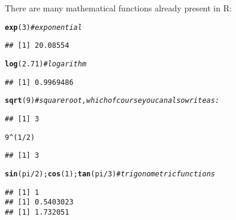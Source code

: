 \documentclass[12pt,a4paper]{scrartcl}\usepackage[]{graphicx}\usepackage[]{color}
\makeatletter
\newcommand{\hlnum}[1]{\textcolor[rgb]{0.686,0.059,0.569}{#1}}%
\newcommand{\hlcom}[1]{\textcolor[rgb]{0.678,0.584,0.686}{\textit{#1}}}%
\newcommand{\hlopt}[1]{\textcolor[rgb]{0,0,0}{#1}}%
\newcommand{\hlstd}[1]{\textcolor[rgb]{0.345,0.345,0.345}{#1}}%
\newcommand{\hlkwd}[1]{\textcolor[rgb]{0.737,0.353,0.396}{\textbf{#1}}}%
\newenvironment{kframe}{%
 \def\at@end@of@kframe{}%
 \ifinner\ifhmode%
  \def\at@end@of@kframe{\end{minipage}}%
  \begin{minipage}{\columnwidth}%
 \fi\fi%
 \def\FrameCommand##1{\hskip\@totalleftmargin \hskip-\fboxsep
 \colorbox{shadecolor}{##1}\hskip-\fboxsep
     \hskip-\linewidth \hskip-\@totalleftmargin \hskip\columnwidth}%
 \MakeFramed {\advance\hsize-\width
   \@totalleftmargin\z@ \linewidth\hsize
   \@setminipage}}%
 {\par\unskip\endMakeFramed%
 \at@end@of@kframe}
\newenvironment{knitrout}{}{} %
\makeatother
\begin{document}
There are many mathematical functions already present in R:
\begin{knitrout}
\color{fgcolor}\begin{kframe}
\begin{alltt}
\hlkwd{exp}\hlstd{(}\hlnum{3}\hlstd{)} \hlcom{#exponential}
\end{alltt}
\begin{verbatim}
## [1] 20.08554
\end{verbatim}
\begin{alltt}
\hlkwd{log}\hlstd{(}\hlnum{2.71}\hlstd{)} \hlcom{#logarithm}
\end{alltt}
\begin{verbatim}
## [1] 0.9969486
\end{verbatim}
\begin{alltt}
\hlkwd{sqrt}\hlstd{(}\hlnum{9}\hlstd{)} \hlcom{#square root, which of course you can also write as:}
\end{alltt}
\begin{verbatim}
## [1] 3
\end{verbatim}
\begin{alltt}
\hlnum{9} \hlopt{^} \hlstd{(}\hlnum{1}\hlopt{/}\hlnum{2}\hlstd{)}
\end{alltt}
\begin{verbatim}
## [1] 3
\end{verbatim}
\begin{alltt}
\hlkwd{sin}\hlstd{(pi}\hlopt{/}\hlnum{2}\hlstd{);} \hlkwd{cos}\hlstd{(}\hlnum{1}\hlstd{);} \hlkwd{tan}\hlstd{(pi}\hlopt{/}\hlnum{3}\hlstd{)} \hlcom{#trigonometric functions}
\end{alltt}
\begin{verbatim}
## [1] 1
## [1] 0.5403023
## [1] 1.732051
\end{verbatim}
\end{kframe}
\end{knitrout}
\end{document}
